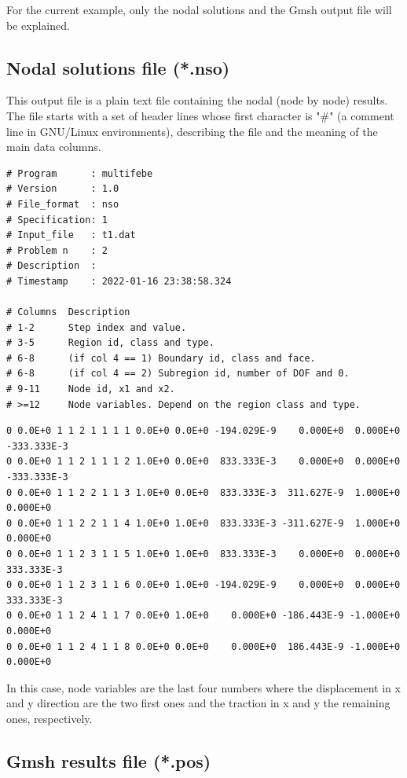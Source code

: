 \documentclass[A4]{article}
\begin{document}
For the current example, only the nodal solutions and the Gmsh output file will be explained.   

\subsection{Nodal solutions file (*.nso)}

This output file is a plain text file containing the nodal (node by node) results. The file starts with a set of header lines whose first character is "$\#$" (a comment line in GNU/Linux environments), describing the file and the meaning of the main data columns. 


\begin{Verbatim}
# Program      : multifebe
# Version      : 1.0
# File_format  : nso
# Specification: 1
# Input_file   : t1.dat
# Problem n    : 2
# Description  : 
# Timestamp    : 2022-01-16 23:38:58.324

# Columns  Description
# 1-2      Step index and value.
# 3-5      Region id, class and type.
# 6-8      (if col 4 == 1) Boundary id, class and face.
# 6-8      (if col 4 == 2) Subregion id, number of DOF and 0.
# 9-11     Node id, x1 and x2.
# >=12     Node variables. Depend on the region class and type.
\end{Verbatim}

\begin{Verbatim}
0 0.0E+0 1 1 2 1 1 1 1 0.0E+0 0.0E+0 -194.029E-9    0.000E+0  0.000E+0 -333.333E-3
0 0.0E+0 1 1 2 1 1 1 2 1.0E+0 0.0E+0  833.333E-3    0.000E+0  0.000E+0 -333.333E-3	
0 0.0E+0 1 1 2 2 1 1 3 1.0E+0 0.0E+0  833.333E-3  311.627E-9  1.000E+0    0.000E+0
0 0.0E+0 1 1 2 2 1 1 4 1.0E+0 1.0E+0  833.333E-3 -311.627E-9  1.000E+0    0.000E+0
0 0.0E+0 1 1 2 3 1 1 5 1.0E+0 1.0E+0  833.333E-3    0.000E+0  0.000E+0  333.333E-3
0 0.0E+0 1 1 2 3 1 1 6 0.0E+0 1.0E+0 -194.029E-9    0.000E+0  0.000E+0  333.333E-3
0 0.0E+0 1 1 2 4 1 1 7 0.0E+0 1.0E+0    0.000E+0 -186.443E-9 -1.000E+0    0.000E+0
0 0.0E+0 1 1 2 4 1 1 8 0.0E+0 0.0E+0    0.000E+0  186.443E-9 -1.000E+0    0.000E+0
\end{Verbatim}

In this case, node variables are the last four numbers where the displacement in x and y direction are the two first ones and the traction in x and y the remaining ones, respectively. 

\subsection{Gmsh results file (*.pos)}
\end{document}
